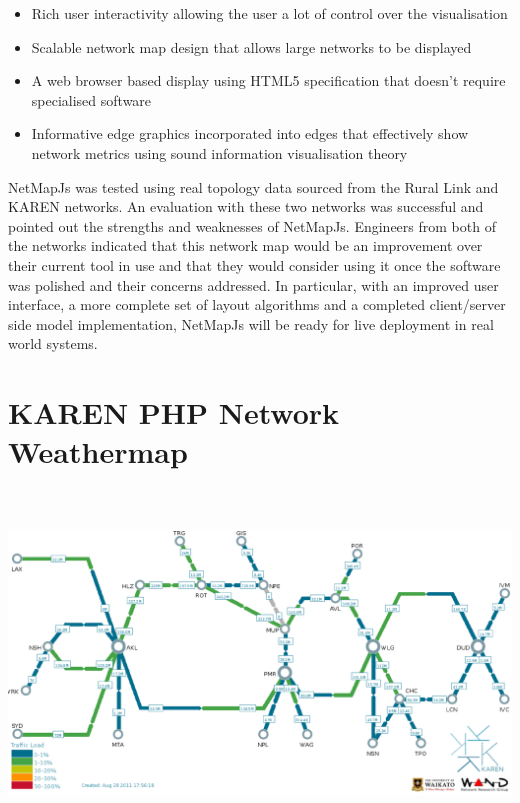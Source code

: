 \documentclass[11pt, a4paper]{article}
\begin{document}
\begin{itemize}
  \item Rich user interactivity allowing the user a lot of control over the
  visualisation
  \item Scalable network map design that allows large networks to be displayed
  \item A web browser based display using HTML5 specification that doesn't
  require specialised software
  \item Informative edge graphics incorporated into edges that effectively show
  network metrics using sound information visualisation theory 
\end{itemize}

NetMapJs was tested using real topology data sourced from the Rural Link and
KAREN networks. An evaluation with these two networks was successful and pointed
out the strengths and weaknesses of NetMapJs. Engineers from both of the
networks indicated that this network map would be an improvement over their
current tool in use and that they would consider using it once the software was
polished and their concerns addressed. In particular, with an improved user
interface, a more complete set of layout algorithms and a completed
client/server side model implementation, NetMapJs will be ready for live
deployment in real world systems.

\newpage





\newpage

\appendix
\appendixpage

\section{KAREN PHP Network Weathermap}
\label{app:karenphp}
\centering
\includegraphics[width=170mm,height=90.76mm]{assets/karen-phpweathermap.eps}
\end{document}
